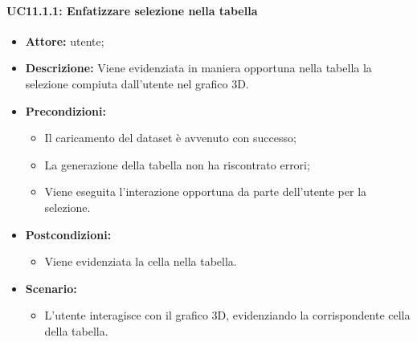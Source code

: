 \paragraph{UC11.1.1: Enfatizzare selezione nella tabella}
\begin{itemize}    
    \item \textbf{Attore:} utente;
    \item \textbf{Descrizione:} Viene evidenziata in maniera opportuna nella tabella la selezione compiuta dall'utente nel grafico 3D.
    \item \textbf{Precondizioni:}    
        \begin{itemize}
            \item Il caricamento del dataset è avvenuto con successo;
            \item La generazione della tabella non ha riscontrato errori;
            \item Viene eseguita l'interazione opportuna da parte dell'utente per la selezione.
        \end{itemize}    
    \item \textbf{Postcondizioni:}
        \begin{itemize}
            \item Viene evidenziata la cella nella tabella.
        \end{itemize}    
    \item \textbf{Scenario:} 
        \begin{itemize}
            \item L'utente interagisce con il grafico 3D, evidenziando la corrispondente cella della tabella.
        \end{itemize}
\end{itemize}

\pagebreak

